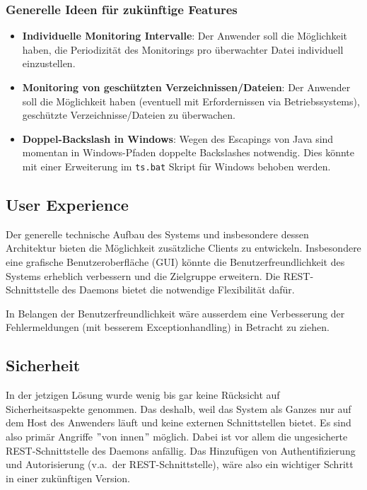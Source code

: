 \documentclass[a4paper,12pt]{report}
\begin{document}
    \subsubsection{Generelle Ideen für zukünftige Features}
    \begin{itemize}
        \item \textbf{Individuelle Monitoring Intervalle}: Der Anwender soll die Möglichkeit haben, die Periodizität des Monitorings pro überwachter Datei individuell einzustellen.
        \item \textbf{Monitoring von geschützten Verzeichnissen/Dateien}: Der Anwender soll die Möglichkeit haben (eventuell mit Erfordernissen via Betriebssystems), geschützte Verzeichnisse/Dateien zu überwachen.
        \item \textbf{Doppel-Backslash in Windows}: Wegen des Escapings von Java sind momentan in Windows-Pfaden doppelte Backslashes notwendig.
        Dies könnte mit einer Erweiterung im \texttt{ts.bat} Skript für Windows behoben werden.
    \end{itemize}


    \subsection{User Experience}\label{subsec:user-experience}
    Der generelle technische Aufbau des Systems und insbesondere dessen Architektur bieten die Möglichkeit zusätzliche Clients zu entwickeln.
    Insbesondere eine grafische Benutzeroberfläche (GUI) könnte die Benutzerfreundlichkeit des Systems erheblich verbessern und die Zielgruppe erweitern.
    Die REST-Schnittstelle des Daemons bietet die notwendige Flexibilität dafür.

    In Belangen der Benutzerfreundlichkeit wäre ausserdem eine Verbesserung der Fehlermeldungen (mit besserem Exceptionhandling) in Betracht zu ziehen.

    \clearpage

    \subsection{Sicherheit}\label{subsec:sicherheit}
    In der jetzigen Lösung wurde wenig bis gar keine Rücksicht auf Sicherheitsaspekte genommen.
    Das deshalb, weil das System als Ganzes nur auf dem Host des Anwenders läuft und keine externen Schnittstellen bietet.
    Es sind also primär Angriffe \("\)von innen\("\) möglich.
    Dabei ist vor allem die ungesicherte REST-Schnittstelle des Daemons anfällig.
    Das Hinzufügen von Authentifizierung und Autorisierung (v.a.\ der REST-Schnittstelle), wäre also ein wichtiger Schritt in einer zukünftigen Version.
\end{document}
